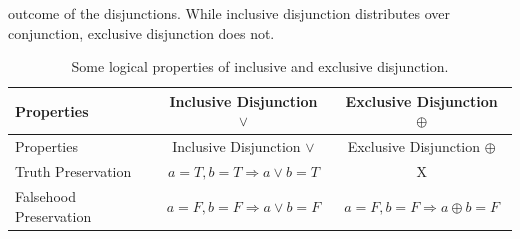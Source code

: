 \documentclass[oneside]{report}
\theoremstyle{definition}
\theoremstyle{definition}
\theoremstyle{definition}
\theoremstyle{remark}
\begin{document}
outcome of the disjunctions. While inclusive disjunction distributes
over conjunction, exclusive disjunction does not.
\begin{longtable}[]{@{}lcc@{}}
\caption{\label{tab:logicalproperties} Some logical properties of inclusive
and exclusive disjunction.}\tabularnewline
\toprule
\begin{minipage}[b]{0.23\columnwidth}\raggedright\strut
Properties\strut
\end{minipage} & \begin{minipage}[b]{0.37\columnwidth}\centering\strut
Inclusive Disjunction \(\lor\)\strut
\end{minipage} & \begin{minipage}[b]{0.31\columnwidth}\centering\strut
Exclusive Disjunction \(\oplus\)\strut
\end{minipage}\tabularnewline
\midrule
\endfirsthead
\toprule
\begin{minipage}[b]{0.23\columnwidth}\raggedright\strut
Properties\strut
\end{minipage} & \begin{minipage}[b]{0.37\columnwidth}\centering\strut
Inclusive Disjunction \(\lor\)\strut
\end{minipage} & \begin{minipage}[b]{0.31\columnwidth}\centering\strut
Exclusive Disjunction \(\oplus\)\strut
\end{minipage}\tabularnewline
\midrule
\endhead
\begin{minipage}[t]{0.23\columnwidth}\raggedright\strut
Truth Preservation\strut
\end{minipage} & \begin{minipage}[t]{0.37\columnwidth}\centering\strut
\(a=T,b=T \Rightarrow a \lor b = T\)\strut
\end{minipage} & \begin{minipage}[t]{0.31\columnwidth}\centering\strut
X\strut
\end{minipage}\tabularnewline
\begin{minipage}[t]{0.23\columnwidth}\raggedright\strut
Falsehood Preservation\strut
\end{minipage} & \begin{minipage}[t]{0.37\columnwidth}\centering\strut
\(a=F, b=F \Rightarrow a \lor b = F\)\strut
\end{minipage} & \begin{minipage}[t]{0.31\columnwidth}\centering\strut
\(a=F, b=F \Rightarrow a \oplus b = F\)\strut
\end{minipage}\tabularnewline

\end{longtable}
\end{document}
